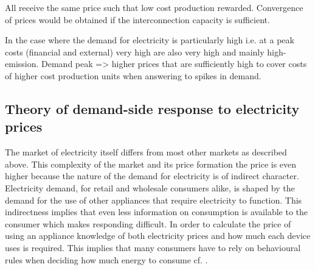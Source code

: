 All receive the same price such that low cost production rewarded. Convergence of prices would be obtained if the interconnection capacity is sufficient.

In the case where the demand for electricity is particularly high i.e. at a peak costs (financial and external) very high are also very high and mainly high-emission. Demand peak => higher prices that are sufficiently high to cover costs of higher cost production units
when answering to spikes in demand.




\subsection{Theory of demand-side response to electricity prices}
\label{subsec:t_demand}
The market of electricity itself differs from most other markets as described above. This complexity of the market and its price formation the price is even higher because the nature of the demand for electricity is of indirect character. Electricity demand, for retail and wholesale consumers alike, is shaped by the demand for the use of other appliances that require electricity to function.
This indirectness implies that even less information on consumption is available to the consumer which makes responding difficult. In order to calculate the price of using an appliance knowledge of both electricity prices and how much each device uses is required. This implies that many consumers have to rely on behavioural rules when deciding how much energy to consume cf. \citep{kirschen2003demand}.


